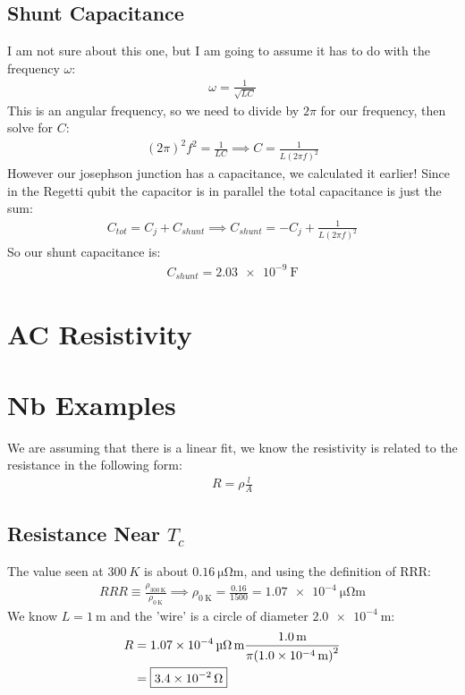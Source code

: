 \documentclass[12pt]{article}
\begin{document}
\subsection{Shunt Capacitance}
I am not sure about this one, but I am going to assume it has to do with the frequency $\omega$:
\begin{align*}
  \omega=\frac{1}{\sqrt{LC}}
\end{align*}
This is an angular frequency, so we need to divide by $2\pi$ for our frequency, then solve for $C$:
\begin{align*}
  (2\pi)^2f^2=\frac{1}{LC}\implies C=\frac{1}{L(2\pi f)^2}
\end{align*}
However our josephson junction has a capacitance, we calculated it earlier! Since in the Regetti qubit the capacitor is in parallel the total capacitance is just the sum:
\begin{align*}
  C_{tot}=C_j+C_{shunt}\implies C_{shunt}=-C_j+\frac{1}{L(2\pi f)^2}
\end{align*}
So our shunt capacitance is:
\begin{align*}
  \boxed{C_{shunt}=\SI{2.03e-9}{\F}}
\end{align*}
\section{AC Resistivity}

\section{Nb Examples}
We are assuming that there is a linear fit, we know the resistivity is related to the resistance in the following form:
\begin{align*}
  R=\rho\frac{l}{A}
\end{align*}
\subsection{Resistance Near $T_c$}
The value seen at $\SI{300}{K}$ is about $\SI{0.16}{\micro\ohm\m}$, and using the definition of RRR:
\begin{align*}
  RRR\equiv\frac{\rho_{\SI{300}{\K}}}{\rho_{\SI{0}{\K}}}\implies\rho_{\SI{0}{\K}}
  =\frac{0.16}{1500}=\SI{1.07e-4}{\micro\ohm\meter}
\end{align*}
We know $L=\SI{1}{\m}$ and the 'wire' is a circle of diameter $\SI{2.0e-4}{\m}$:
\begin{align*}
  R&=\SI{1.07e-4}{\micro\ohm\m}\frac{\SI{1.0}{\m}}{\pi\qty(\SI{1.0e-4}{\m})^2}\\
  &=\boxed{\SI{3.4e-2}{\ohm}}
\end{align*}
\end{document}

